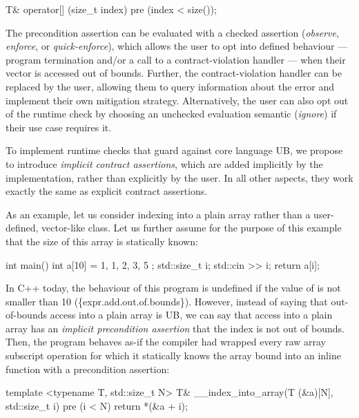 \begin{codeblock}
T& operator[] (size_t index)
  pre (index < size());
\end{codeblock}

The precondition assertion  can be evaluated with a checked assertion  (\emph{observe}, \emph{enforce}, or \emph{quick-enforce}), which allows the user to opt into defined behaviour --- program termination and/or a call to a contract-violation handler --- when their vector is accessed out of bounds. Further, the contract-violation handler can be replaced by the user, allowing them to query information about the error and implement their own mitigation strategy. Alternatively, the user can also opt out of the runtime check by choosing an unchecked evaluation semantic (\emph{ignore}) if their use case requires it.

To implement runtime checks that guard against core language UB, we propose to introduce \emph{implicit contract assertions}, which are added implicitly by the implementation, rather than explicitly by the user. In all other aspects, they work exactly the same as explicit contract assertions.

As an example, let us consider indexing into a plain array rather than a user-defined, vector-like class. Let us further assume for the purpose of this example that the size  of this array is statically known:

\begin{codeblock}
int main() {
  int a[10] = { 1, 1, 2, 3, 5 };
  std::size_t i; 
  std::cin >> i;
  return a[i];
}
\end{codeblock}

In C++ today, the behaviour of this program is undefined if the value of  is not smaller than 10 (\{expr.add.out.of.bounds\}). However, instead of saying that out-of-bounds access into a plain array is UB, we can say that access into a plain array has an \emph{implicit precondition assertion} that the index is not out of bounds. Then, the program behaves as-if the compiler had wrapped every raw array subscript operation for which it statically knows the array bound  into an inline function with a precondition assertion:

\begin{codeblock}
template <typename T, std::size_t N>
T& __index_into_array(T (&a)[N], std::size_t i) 
pre (i < N) {
  return *(&a + i);
}
\end{codeblock}

